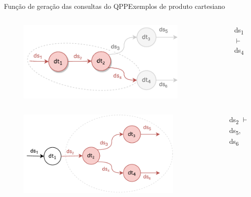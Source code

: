 \documentclass[12pt,compress]{beamer}
\begin{document}

\begin{frame}[t]{Função de geração das consultas do QPP}{Exemplos de produto cartesiano}

\vspace{-.75cm}

\begin{columns}


\begin{figure}
\includegraphics[width=0.85\textwidth]{img/example-query-dataflow-1.pdf}
\end{figure}


ds\textsubscript{1} $\vdash$ ds\textsubscript{4}

\end{columns}

\begin{columns}[t]


\begin{figure}
\includegraphics[width=0.85\textwidth]{img/example-query-dataflow-2.pdf}
\end{figure}


ds\textsubscript{2} $\vdash$ ds\textsubscript{5}, ds\textsubscript{6}

\end{columns}

\end{frame}
\end{document}
